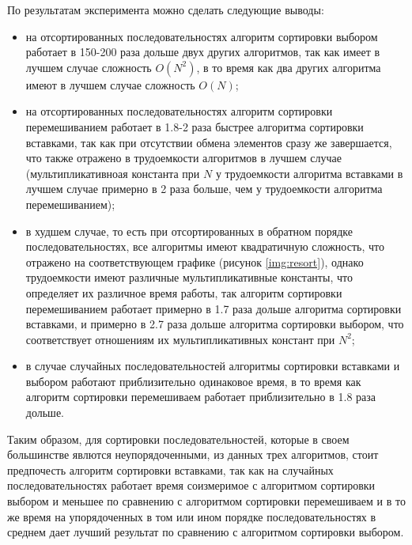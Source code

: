По результатам эксперимента можно сделать следующие выводы:
\begin{itemize}[left=\parindent]
    \item на отсортированных последовательностях алгоритм сортировки выбором
        работает в 150-200 раза дольше двух других алгоритмов, так как имеет в
        лучшем случае сложность $O(N^2)$, в то время как два других алгоритма
        имеют в лучшем случае сложность $O(N)$;
    \item на отсортированных последовательностях алгоритм сортировки
        перемешиванием работает в 1.8-2 раза быстрее алгоритма сортировки
        вставками, так как при отсутствии обмена элементов сразу же
        завершается, что также отражено в трудоемкости алгоритмов в лучшем
        случае (мультипликативноая константа при $N$ у трудоемкости алгоритма
        вставками в лучшем случае примерно в 2 раза больше, чем у трудоемкости
        алгоритма перемешиванием);
    \item в худшем случае, то есть при отсортированных в обратном порядке
        последовательностях, все алгоритмы имеют квадратичную сложность, что
        отражено на соответствующем графике (рисунок \ref{img:resort}), однако
        трудоемкости имеют различные мультипликативные константы, что
        определяет их различное время работы, так алгоритм сортировки
        перемешиванием работает примерно в 1.7 раза дольше алгоритма сортировки
        вставками, и примерно в 2.7 раза дольше алгоритма сортировки выбором,
        что соответствует отношениям их мультипликативных констант при $N^2$;
    \item в случае случайных последовательностей алгоритмы сортировки вставками
        и выбором работают приблизительно одинаковое время, в то время как
        алгоритм сортировки перемешиваем работает приблизительно в 1.8 раза
        дольше.
\end{itemize}

Таким образом, для сортировки последовательностей, которые в своем большинстве
явлются неупорядоченными, из данных трех алгоритмов, стоит предпочесть алгоритм
сортировки вставками, так как на случайных последовательностях работает время
соизмеримое с алгоритмом сортировки выбором и меньшее по сравнению с алгоритмом
сортировки перемешиваем и в то же время на упорядоченных в том или ином порядке
последовательностях в среднем дает лучший результат по сравнению с алгоритмом
сортировки выбором.
